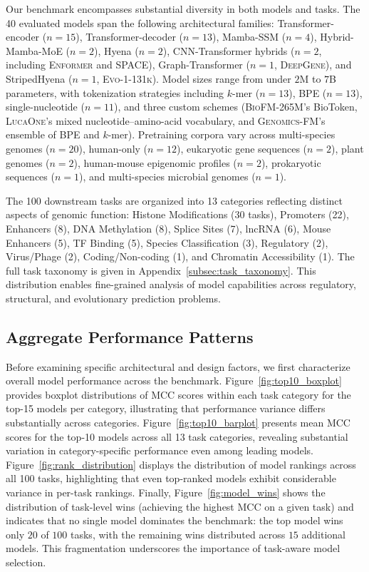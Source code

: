 \documentclass{llmxive}
\begin{document}
Our benchmark encompasses substantial diversity in both models and
tasks. The 40 evaluated models span the following architectural
families: Transformer-encoder ($n=15$), Transformer-decoder ($n=13$),
Mamba-SSM ($n=4$), Hybrid-Mamba-MoE ($n=2$), Hyena ($n=2$),
CNN-Transformer hybrids ($n=2$, including \textsc{Enformer} and
\textsc{SPACE}), Graph-Transformer ($n=1$, \textsc{DeepGene}), and
StripedHyena ($n=1$, \textsc{Evo-1-131k}). Model sizes range from
under $2$M to $7$B parameters, with tokenization strategies including
$k$-mer ($n=13$), BPE ($n=13$), single-nucleotide ($n=11$), and three
custom schemes (\textsc{BioFM-265M}'s BioToken, \textsc{LucaOne}'s
mixed nucleotide--amino-acid vocabulary, and \textsc{Genomics-FM}'s
ensemble of BPE and $k$-mer). Pretraining corpora vary across
multi-species genomes ($n=20$), human-only ($n=12$), eukaryotic gene
sequences ($n=2$), plant genomes ($n=2$), human-mouse epigenomic
profiles ($n=2$), prokaryotic sequences ($n=1$), and multi-species
microbial genomes ($n=1$).

The 100 downstream tasks are organized into 13 categories reflecting
distinct aspects of genomic function: Histone Modifications (30 tasks),
Promoters (22), Enhancers (8), DNA Methylation (8), Splice Sites (7),
lncRNA (6), Mouse Enhancers (5), TF Binding (5), Species
Classification (3), Regulatory (2), Virus/Phage (2),
Coding/Non-coding (1), and Chromatin Accessibility (1). The full task
taxonomy is given in Appendix~\ref{subsec:task_taxonomy}. This
distribution enables fine-grained analysis of model capabilities
across regulatory, structural, and evolutionary prediction problems.

\subsection{Aggregate Performance Patterns}
\label{subsec:aggregate}

Before examining specific architectural and design factors, we first
characterize overall model performance across the benchmark.
Figure~\ref{fig:top10_boxplot} provides boxplot distributions of MCC
scores within each task category for the top-15 models per category,
illustrating that performance variance differs substantially across
categories. 
Figure~\ref{fig:top10_barplot} presents mean MCC scores for the top-10
models across all 13 task categories, revealing substantial variation
in category-specific performance even among leading models.
Figure~\ref{fig:rank_distribution} displays the distribution of model
rankings across all 100 tasks, highlighting that even top-ranked
models exhibit considerable variance in per-task rankings. 
Finally, Figure~\ref{fig:model_wins} shows the distribution of task-level wins
(achieving the highest MCC on a given task) and indicates that no
single model dominates the benchmark: the top model wins only $20$ of
$100$ tasks, with the remaining wins distributed across $15$ additional
models. This fragmentation underscores the importance of task-aware
model selection.
\end{document}
